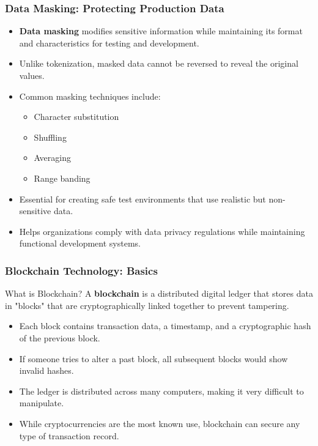 \documentclass{beamer}
\begin{document}
\begin{frame}
    \frametitle{Data Masking: Protecting Production Data}
    
    \begin{itemize}
        \item \textbf{Data masking} modifies sensitive information while maintaining its format and characteristics for testing and development.
        
        \item Unlike tokenization, masked data cannot be reversed to reveal the original values.
        
        \item Common masking techniques include:
            \begin{itemize}
                \item Character substitution
                \item Shuffling
                \item Averaging
                \item Range banding
            \end{itemize}
        
        \item Essential for creating safe test environments that use realistic but non-sensitive data.
        
        \item Helps organizations comply with data privacy regulations while maintaining functional development systems.
    \end{itemize}
\end{frame}

\begin{frame}
    \frametitle{Blockchain Technology: Basics}
    
    \begin{block}{What is Blockchain?}
        A \textbf{blockchain} is a distributed digital ledger that stores data in "blocks" that are cryptographically linked together to prevent tampering.
    \end{block}
    
    \begin{itemize}
        \item Each block contains transaction data, a timestamp, and a cryptographic hash of the previous block.
        
        \item If someone tries to alter a past block, all subsequent blocks would show invalid hashes.
        
        \item The ledger is distributed across many computers, making it very difficult to manipulate.
        
        \item While cryptocurrencies are the most known use, blockchain can secure any type of transaction record.
    \end{itemize}
\end{frame}
\end{document}
